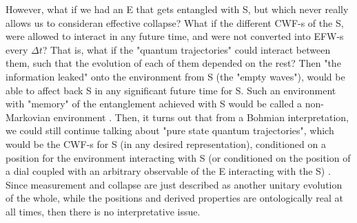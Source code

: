 \documentclass[11pt, a4paper]{article} %
\begin{document}

However, what if we had an E that gets entangled with S, but which never really allows us to consideran effective collapse? What if the different CWF-s of the S, were allowed to interact in any future time, and were not converted into EFW-s every $\Delta t$? That is, what if the "quantum trajectories" could interact between them, such that the evolution of each of them depended on the rest? Then "the information leaked" onto the environment from S (the "empty waves"), would be able to affect back S in any significant future time for S. Such an environment with "memory" of the entanglement achieved with S would be called a non-Markovian environment \cite{MarkovianityDefs}. Then, it turns out that from a Bohmian interpretation, we could still continue talking about "pure state quantum trajectories", which would be the CWF-s for S (in any desired representation), conditioned on a position for the environment interacting with S (or conditioned on the position of a dial coupled with an arbitrary observable of the E interacting with the S) \cite{NMisModal, interpretSSE}. Since measurement and collapse are just described as another unitary evolution of the whole, while the positions and derived properties are ontologically real at all times, then there is no interpretative issue.
\end{document}
